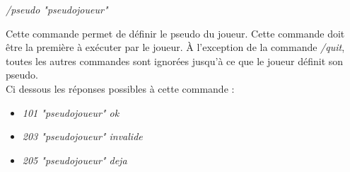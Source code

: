 \par
\textit{/pseudo "pseudojoueur"}

\par
Cette commande permet de définir le pseudo du joueur. Cette commande doit être la première à exécuter par le joueur. À l'exception de la commande \textit{/quit}, toutes les autres commandes sont ignorées jusqu'à ce que le joueur définit son pseudo.\\

Ci dessous les réponses possibles à cette commande : 
\begin{itemize}

	\item \textit{101 "pseudojoueur" ok}
	
	\item \textit{203 "pseudojoueur" invalide}

	\item \textit{205 "pseudojoueur" deja} \\
	
\end{itemize}